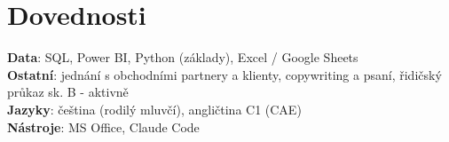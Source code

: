 \documentclass[a4paper,11pt]{article}
\begin{document}
\section{Dovednosti}
 \begin{itemize}[leftmargin=0.15in, label={}]
    \small{\item{
     \textbf{Data}{: SQL, Power BI, Python (základy), Excel / Google Sheets} \\
     \textbf{Ostatní}{: jednání s obchodními partnery a klienty, copywriting a psaní, řidičský průkaz sk. B - aktivně} \\
     \textbf{Jazyky}{: čeština (rodilý mluvčí), angličtina C1 (CAE)}\\
     \textbf{Nástroje}{: MS Office, Claude Code} \\
    }}
 \end{itemize}


\end{document}

